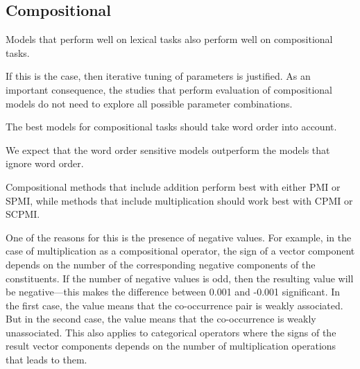\subsection{Compositional}
\label{sec:hyp-composition}

\begin{hyp}
\label{hyp:not-lextocomp}
Models that perform well on lexical tasks also perform well on compositional tasks.
\end{hyp}

If this is the case, then iterative tuning of parameters is justified. As an important consequence, the studies that perform evaluation of compositional models do not need to explore all possible parameter combinations.

\begin{hyp}
\label{hyp:order}
The best models for compositional tasks should take word order into account.
\end{hyp}

We expect that the word order sensitive models outperform the models that ignore word order.

\begin{hyp}
  \label{hyp:comp-pmi-cpmi}
  Compositional methods that include addition perform best with either PMI or SPMI, while methods that include multiplication should work best with CPMI or SCPMI.
\end{hyp}

One of the reasons for this is the presence of negative values. For example, in the case of multiplication as a compositional operator, the sign of a vector component depends on the number of the corresponding negative components of the constituents. If the number of negative values is odd, then the resulting value will be negative---this makes the difference between 0.001 and -0.001 significant. In the first case, the value means that the co-occurrence pair is weakly associated. But in the second case, the value means that the co-occurrence is weakly unassociated. This also applies to categorical operators where the signs of the result vector components depends on the number of multiplication operations that leads to them.

